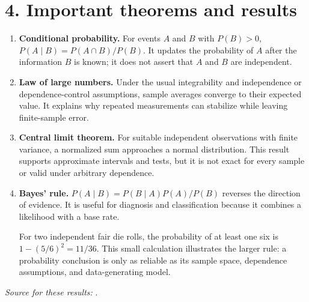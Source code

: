 \section*{4. Important theorems and results}
\begin{enumerate}[leftmargin=*,itemsep=0.35em]
\item \textbf{Conditional probability.} For events $A$ and $B$ with $P(B)>0$, $P(A\mid B)=P(A\cap B)/P(B)$. It updates the probability of $A$ after the information $B$ is known; it does not assert that $A$ and $B$ are independent.

\item \textbf{Law of large numbers.} Under the usual integrability and independence or dependence-control assumptions, sample averages converge to their expected value. It explains why repeated measurements can stabilize while leaving finite-sample error.

\item \textbf{Central limit theorem.} For suitable independent observations with finite variance, a normalized sum approaches a normal distribution. This result supports approximate intervals and tests, but it is not exact for every sample or valid under arbitrary dependence.

\item \textbf{Bayes' rule.} $P(A\mid B)=P(B\mid A)P(A)/P(B)$ reverses the direction of evidence. It is useful for diagnosis and classification because it combines a likelihood with a base rate.

For two independent fair die rolls, the probability of at least one six is $1-(5/6)^2=11/36$. This small calculation illustrates the larger rule: a probability conclusion is only as reliable as its sample space, dependence assumptions, and data-generating model.\end{enumerate}
\noindent\emph{Source for these results:} \cite{probability_theory_ref1}.

